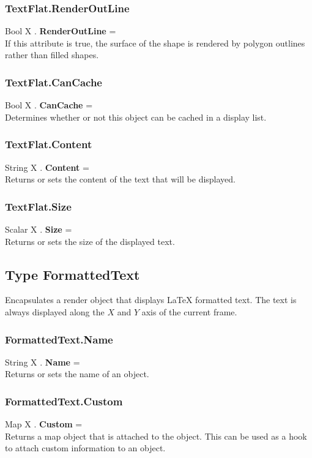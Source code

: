 \subsubsection{TextFlat.RenderOutLine \label{F:TextFlat:RenderOutLine}}
Bool X . \textbf{RenderOutLine} = \\
If this attribute is true, the surface of the shape is rendered by polygon outlines rather than filled shapes.

\subsubsection{TextFlat.CanCache \label{F:TextFlat:CanCache}}
Bool X . \textbf{CanCache} = \\
Determines whether or not this object can be cached in a display list.

\subsubsection{TextFlat.Content \label{F:TextFlat:Content}}
String X . \textbf{Content} = \\
Returns or sets the content of the text that will be displayed.

\subsubsection{TextFlat.Size \label{F:TextFlat:Size}}
Scalar X . \textbf{Size} = \\
Returns or sets the size of the displayed text.

\subsection{Type FormattedText \label{T:FormattedText}}
Encapsulates a render object that displays LaTeX formatted text. The text is always displayed along the $X$ and $Y$ axis of the current frame.

\subsubsection{FormattedText.Name \label{F:FormattedText:Name}}
String X . \textbf{Name} = \\
Returns or sets the name of an object.

\subsubsection{FormattedText.Custom \label{F:FormattedText:Custom}}
Map X . \textbf{Custom} = \\
Returns a map object that is attached to the object. This can be used as a hook to attach custom information to an object.


